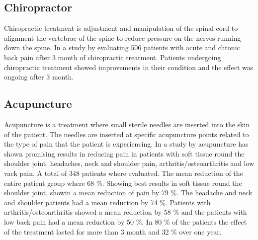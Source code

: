 
\subsection{Chiropractor}
Chiropractic treatment is adjustment and manipulation of the spinal cord to alignment the vertebrae of the spine to reduce pressure on the nerves running down the spine. \cite{Gerald2013}
In a study by \cite{Peterson2012} evaluating 506 patients with acute and chronic back pain after 3 month of chiropractic treatment.
Patients undergoing chiropractic treatment showed improvements in their condition and the effect was ongoing after 3 month. \cite{Peterson2012}

\subsection{Acupuncture}
Acupuncture is a treatment where small sterile needles are inserted into the skin of the patient. The needles are inserted at specific acupuncture points related to the type of pain that the patient is experiencing. \cite{Dhanani2011} 
In a study by \cite{Junnilla1983} acupuncture has shown promising results in reducing pain in patients with soft tissue round the shoulder joint, headaches, neck and shoulder pain, arthritis/osteoarthritis and low vack pain. A total of 348 patients where evaluated. The mean reduction of the entire patient group where 68 \%. Showing best results in soft tissue round the shoulder joint, showin a mean reduction of pain by 79 \%. The headache and neck and shoulder patients had a mean reduction by 74 \%. Patients with  arthritis/osteoarthritis showed a mean reduction by 58 \% and the patients with low back pain had a mean reduction by 50 \%. In 80 \% of the patients the effect of the treatment lasted for more than 3 month and 32 \% over one year. \cite{Junnilla1983}

